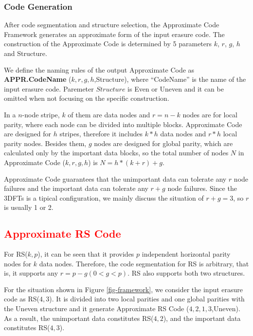 \documentclass[sigconf]{acmart}
\begin{document}
\subsubsection{Code Generation}\label{code-gen}
After code segmentation and structure selection, the Approximate Code Framework generates an approximate form of the input erasure code.
The construction of the Approximate Code is determined by 5 parameters $k$, $r$, $g$, $h$ and Structure.

We define the naming rules of the output Approximate Code as \textbf{APPR.CodeName} ($k,r,g,h$,Structure), where ``CodeName'' is the name of the input erasure code. Paremeter $Structure$ is Even or Uneven and it can be omitted when not focusing on the specific construction.

In a $n$-node stripe, $k$ of them are data nodes and $r=n-k$ nodes are for local parity, where each node can be divided into multiple blocks.
Approximate Code are designed for $h$ stripes, therefore it includes $k*h$ data nodes and $r*h$ local parity nodes.
Besides them, $g$ nodes are designed for global parity, which are calculated only by the important data blocks, so the total number of nodes $N$ in Approximate Code ($k,r,g,h$) is
$N= h*(k+r) + g$.

Approximate Code guarantees that the unimportant data can tolerate any $r$ node failures and the important data can tolerate any $r+g$ node failures.
Since the 3DFTs is a tipical configuration, we mainly discuss the situation of $r+g=3$, so $r$ is usually 1 or 2.

\subsection{\textcolor{red}{Approximate RS Code}}
For RS($k,p$), it can be seen that it provides $p$ independent horizontal parity nodes for $k$ data nodes. Therefore, the code segmentation for RS is arbitrary, that is, it supports any $r=p-g(0<g<p)$. RS also supports both two structures.

For the situation shown in Figure \ref{fig-framework}, we consider the input erasure code as RS($4,3$). It is divided into two local parities and one global parities with the Uneven structure and it generate Approximate RS Code ($4,2,1,3$,Uneven).
As a result, the unimportant data constitutes RS($4,2$), and the important data constitutes RS($4,3$).
\end{document}
